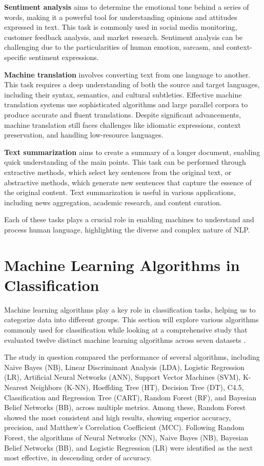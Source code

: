 \textbf{Sentiment analysis} aims to determine the emotional tone behind a series of words, making it a powerful tool for understanding opinions and attitudes expressed in text. This task is commonly used in social media monitoring, customer feedback analysis, and market research. Sentiment analysis can be challenging due to the particularities of human emotion, sarcasm, and context-specific sentiment expressions.

\textbf{Machine translation} involves converting text from one language to another. This task requires a deep understanding of both the source and target languages, including their syntax, semantics, and cultural subtleties. Effective machine translation systems use sophisticated algorithms and large parallel corpora to produce accurate and fluent translations. Despite significant advancements, machine translation still faces challenges like idiomatic expressions, context preservation, and handling low-resource languages.

\textbf{Text summarization} aims to create a summary of a longer document, enabling quick understanding of the main points. This task can be performed through extractive methods, which select key sentences from the original text, or abstractive methods, which generate new sentences that capture the essence of the original content. Text summarization is useful in various applications, including news aggregation, academic research, and content curation.

Each of these tasks plays a crucial role in enabling machines to understand and process human language, highlighting the diverse and complex nature of NLP.

\section{Machine Learning Algorithms in Classification}

Machine learning algorithms play a key role in classification tasks, helping us to categorize data into different groups. This section will explore various algorithms commonly used for classification while looking at a comprehensive study that evaluated twelve distinct machine learning algorithms across seven datasets \cite{siraj2023performanceModelComparison}.

The study \cite{siraj2023performanceModelComparison} in question compared the performance of several algorithms, including Naive Bayes (NB), Linear Discriminant Analysis (LDA), Logistic Regression (LR), Artificial Neural Networks (ANN), Support Vector Machines (SVM), K-Nearest Neighbors (K-NN), Hoeffding Tree (HT), Decision Tree (DT), C4.5, Classification and Regression Tree (CART), Random Forest (RF), and Bayesian Belief Networks (BB), across multiple metrics. Among these, Random Forest showed the most consistent and high results, showing superior accuracy, precision, and Matthew’s Correlation Coefficient (MCC). Following Random Forest, the algorithms of Neural Networks (NN), Naive Bayes (NB), Bayesian Belief Networks (BB), and Logistic Regression (LR) were identified as the next most effective, in descending order of accuracy.

